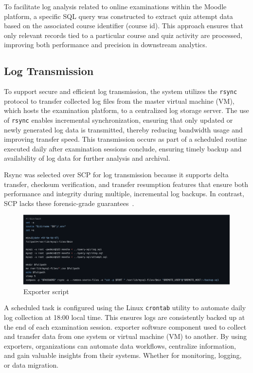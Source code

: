 To facilitate log analysis related to online examinations within the Moodle platform, a specific SQL query was constructed to extract quiz attempt data based on the associated course identifier (course id). This approach ensures that only relevant records tied to a particular course and quiz activity are processed, improving both performance and precision in downstream analytics.
\subsection{Log Transmission}
To support secure and efficient log transmission, the system utilizes the \texttt{rsync} protocol to transfer collected log files from the master virtual machine (VM), which hosts the examination platform, to a centralized log storage server. The use of \texttt{rsync} enables incremental synchronization, ensuring that only updated or newly generated log data is transmitted, thereby reducing bandwidth usage and improving transfer speed. This transmission occurs as part of a scheduled routine executed daily after examination sessions conclude, ensuring timely backup and availability of log data for further analysis and archival.

Rsync was selected over SCP for log transmission because it supports delta transfer, checksum verification, and transfer resumption features that ensure both performance and integrity during multiple, incremental log backups. In contrast, SCP lacks these forensic-grade guarantees~\cite{nussbaum2012performance,superuser_rsync_vs_scp,stackexchange_rsync_scp_checksum}.


\begin{figure}[H] 
	\centering
	\includegraphics[width=14cm]{figure/export-sql.png}
	\caption{Exporter script}
	\label{fig:exporter}
\end{figure}

A scheduled task is configured using the Linux \texttt{crontab} utility to automate daily log collection at 18:00 local time. This ensures logs are consistently backed up at the end of each examination session. exporter software component used to collect and transfer data from one system or virtual machine (VM) to another. By using exporters, organizations can automate data workflows, centralize information, and gain valuable insights from their systems. Whether for monitoring, logging, or data migration.

